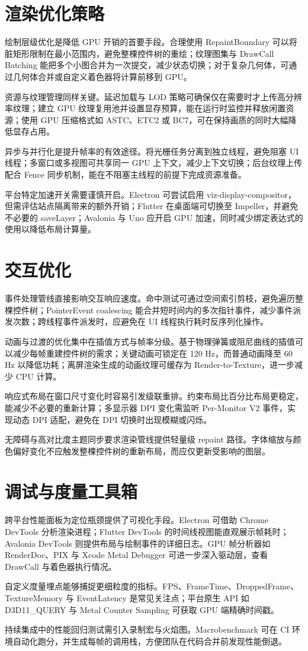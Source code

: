 \chapter{渲染优化策略}
绘制层级优化是降低 GPU 开销的首要手段。合理使用 RepaintBoundary 可以将脏矩形限制在最小范围内，避免整棵控件树的重绘；纹理图集与 DrawCall Batching 能把多个小图合并为一次提交，减少状态切换；对于复杂几何体，可通过几何体合并或自定义着色器将计算前移到 GPU。\par
资源与纹理管理同样关键。延迟加载与 LOD 策略可确保仅在需要时才上传高分辨率纹理；建立 GPU 纹理复用池并设置显存预算，能在运行时监控并释放闲置资源；使用 GPU 压缩格式如 ASTC、ETC2 或 BC7，可在保持画质的同时大幅降低显存占用。\par
异步与并行化是提升帧率的有效途径。将光栅任务分离到独立线程，避免阻塞 UI 线程；多窗口或多视图可共享同一 GPU 上下文，减少上下文切换；后台纹理上传配合 Fence 同步机制，能在不阻塞主线程的前提下完成资源准备。\par
平台特定加速开关需要谨慎开启。Electron 可尝试启用 viz-display-compositor，但需评估站点隔离带来的额外开销；Flutter 在桌面端可切换至 Impeller，并避免不必要的 saveLayer；Avalonia 与 Uno 应开启 GPU 加速，同时减少绑定表达式的使用以降低布局计算量。\par
\chapter{交互优化}
事件处理管线直接影响交互响应速度。命中测试可通过空间索引剪枝，避免遍历整棵控件树；PointerEvent coalescing 能合并短时间内的多次指针事件，减少事件派发次数；跨线程事件派发时，应避免在 UI 线程执行耗时反序列化操作。\par
动画与过渡的优化集中在插值方式与帧率分级。基于物理弹簧或阻尼曲线的插值可以减少每帧重建控件树的需求；关键动画可锁定在 120 Hz，而普通动画降至 60 Hz 以降低功耗；离屏渲染生成的动画纹理可缓存为 Render-to-Texture，进一步减少 CPU 计算。\par
响应式布局在窗口尺寸变化时容易引发级联重排。约束布局比百分比布局更稳定，能减少不必要的重新计算；多显示器 DPI 变化需监听 Per-Monitor V2 事件，实现动态 DPI 适配，避免在 DPI 切换时出现模糊或闪烁。\par
无障碍与高对比度主题同步要求渲染管线提供轻量级 repaint 路径。字体缩放与颜色偏好变化不应触发整棵控件树的重新布局，而应仅更新受影响的图层。\par
\chapter{调试与度量工具箱}
跨平台性能面板为定位瓶颈提供了可视化手段。Electron 可借助 Chrome DevTools 分析渲染进程；Flutter DevTools 的时间线视图能直观展示帧耗时；Avalonia DevTools 则提供布局与绘制事件的详细日志。GPU 帧分析器如 RenderDoc、PIX 与 Xcode Metal Debugger 可进一步深入驱动层，查看 DrawCall 与着色器执行情况。\par
自定义度量埋点能够捕捉更细粒度的指标。FPS、FrameTime、DroppedFrame、TextureMemory 与 EventLatency 是常见关注点；平台原生 API 如 D3D11\_{}QUERY 与 Metal Counter Sampling 可获取 GPU 端精确时间戳。\par
持续集成中的性能回归测试需引入录制宏与火焰图。Macrobenchmark 可在 CI 环境自动化跑分，并生成每帧的调用栈，方便团队在代码合并前发现性能倒退。\par
